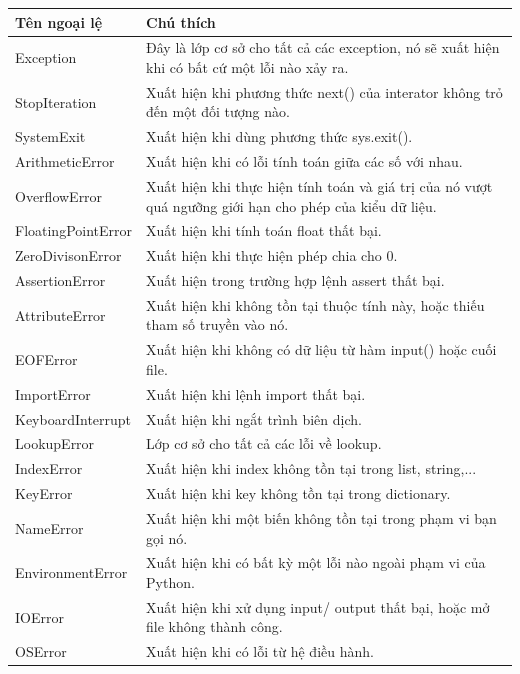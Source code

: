 \begin{table}[h]
	\centering
	\begin{tabular}{|l||p{12cm}|}
		\hline
		Tên ngoại lệ & Chú thích \\
		\hline
		\hline
		Exception & Đây là lớp cơ sở cho tất cả các exception, nó sẽ xuất hiện khi có bất cứ một lỗi nào xảy ra. \\
		\hline
		StopIteration & Xuất hiện khi phương thức next() của interator không trỏ đến một đối tượng nào.\\
		\hline
		SystemExit &	Xuất hiện khi dùng phương thức sys.exit().\\
		\hline
		ArithmeticError & Xuất hiện khi có lỗi tính toán giữa các số với nhau.\\
		\hline
		OverflowError &	Xuất hiện khi thực hiện tính toán và giá trị của nó vượt quá ngưỡng giới hạn cho phép của kiểu dữ liệu.\\
		\hline
		FloatingPointError &	Xuất hiện khi tính toán float thất bại.\\
		\hline
		ZeroDivisonError &	Xuất hiện khi thực hiện phép chia cho 0.\\
		\hline
		AssertionError &	Xuất hiện trong trường hợp lệnh assert thất bại.\\
		\hline
		AttributeError &	Xuất hiện khi không tồn tại thuộc tính này, hoặc thiếu tham số truyền vào nó.\\
		\hline
		EOFError &	Xuất hiện khi không có dữ liệu từ hàm input() hoặc cuối file.\\
		\hline
		ImportError &	Xuất hiện khi lệnh import thất bại.\\
		\hline
		KeyboardInterrupt &	Xuất hiện khi ngắt trình biên dịch.\\
		\hline
		LookupError &	Lớp cơ sở cho tất cả các lỗi về lookup.\\
		\hline
		IndexError &	Xuất hiện khi index không tồn tại trong list, string,...\\
		\hline
		KeyError &	Xuất hiện khi key không tồn tại trong dictionary.\\
		\hline
		NameError &	Xuất hiện khi một biến không tồn tại trong phạm vi bạn gọi nó.\\
		\hline
		EnvironmentError &	Xuất hiện khi có bất kỳ một lỗi nào ngoài phạm vi của Python.\\
		\hline
		IOError &	Xuất hiện khi xử dụng input/ output thất bại, hoặc  mở file không thành công.\\
		\hline
		OSError &	Xuất hiện khi có lỗi từ hệ điều hành.\\

\end{tabular}
\end{table}

